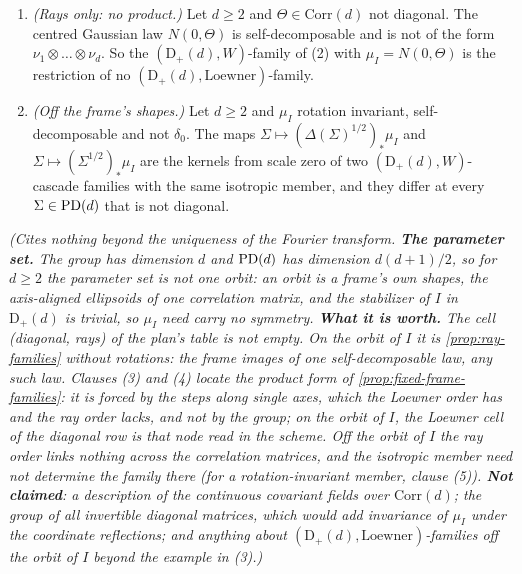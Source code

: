\begin{proposition}
\begin{enumerate}
\[\]
with self-decomposable laws $\nu_1, \dots, \nu_d$ on $\RR$, not all $\delta_0$. Conversely, for such laws
the map $\Sigma \mapsto (\Delta(\Sigma)^{1/2})_*(\nu_1 \otimes \dots \otimes \nu_d)$ is the family of kernels
from scale zero of a $(\mathrm D_+(d), \text{Loewner})$-cascade family.
\item \emph{(Rays only: no product.)} Let $d \ge 2$ and $\Theta \in \mathrm{Corr}(d)$ not diagonal. The centred
Gaussian law $N(0,\Theta)$ is self-decomposable and is not of the form $\nu_1 \otimes \dots \otimes \nu_d$. So
the $(\mathrm D_+(d), W)$-family of (2) with $\mu_I = N(0,\Theta)$ is the restriction of no
$(\mathrm D_+(d), \text{Loewner})$-family.
\item \emph{(Off the frame's shapes.)} Let $d \ge 2$ and $\mu_I$ rotation invariant, self-decomposable and
not $\delta_0$. The maps $\Sigma \mapsto (\Delta(\Sigma)^{1/2})_*\mu_I$ and
$\Sigma \mapsto (\Sigma^{1/2})_*\mu_I$ are the kernels from scale zero of two
$(\mathrm D_+(d), W)$-cascade families with the same isotropic member, and they differ at every
$\Sigma \in \mathrm{PD}(d)$ that is not diagonal.
\end{enumerate}
\statusT\quad\emph{(Cites nothing beyond the uniqueness of the Fourier transform. \textbf{The parameter
set.} The group has dimension $d$ and $\mathrm{PD}(d)$ has dimension $d(d+1)/2$, so for $d \ge 2$ the parameter
set is not one orbit: an orbit is a frame's own shapes, the axis-aligned ellipsoids of one correlation
matrix, and the stabilizer of $I$ in $\mathrm D_+(d)$ is trivial, so $\mu_I$ need carry no symmetry.
\textbf{What it is worth.} The cell (diagonal, rays) of the plan's table is not empty. On the orbit of
$I$ it is \ref{prop:ray-families} without rotations: the frame images of one self-decomposable law, any
such law. Clauses (3) and (4) locate the product form of \ref{prop:fixed-frame-families}: it is forced by
the steps along single axes, which the Loewner order has and the ray order lacks, and not by the group;
on the orbit of $I$, the Loewner cell of the diagonal row is that node read in the scheme. Off the orbit
of $I$ the ray order links nothing across the correlation matrices, and the isotropic member need not
determine the family there (for a rotation-invariant member, clause (5)). \textbf{Not claimed}: a description of the continuous covariant fields over
$\mathrm{Corr}(d)$; the group of all invertible diagonal matrices, which would add invariance of $\mu_I$
under the coordinate reflections; and anything about $(\mathrm D_+(d), \text{Loewner})$-families off the
orbit of $I$ beyond the example in (3).)}
\end{proposition}

